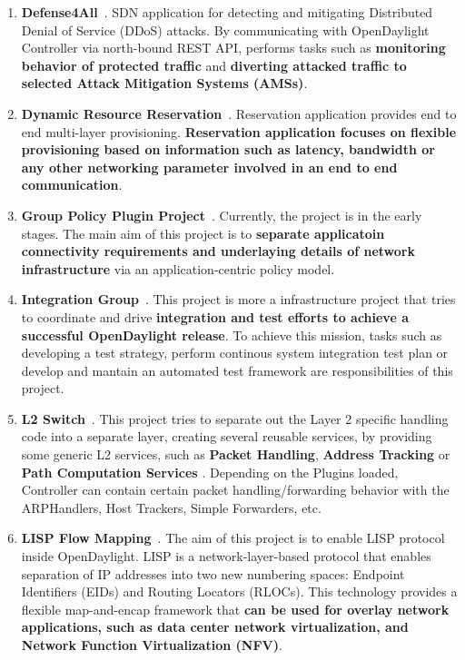 \documentclass[a4paper, 12pt]{book}
\begin{document}
\begin{enumerate}
\item{\textbf{Defense4All}}~\cite{OpenDaylightWikiDefense4All}. SDN application for detecting and mitigating Distributed Denial of Service (DDoS) attacks. By communicating with OpenDaylight Controller via north-bound REST API, performs tasks such as \textbf{monitoring behavior of protected traffic} and \textbf{diverting attacked traffic to selected Attack Mitigation Systems (AMSs)}.
\item{\textbf{Dynamic Resource Reservation}}~\cite{OpenDaylightWikiReservation}. Reservation application provides end to end multi-layer provisioning. \textbf{Reservation application focuses on flexible provisioning based on information such as latency, bandwidth or any other networking parameter involved in an end to end communication}.
\item{\textbf{Group Policy Plugin Project}}~\cite{OpenDaylightWikiGroupPolicy}. Currently, the project is in the early stages. The main aim of this project is to \textbf{separate applicatoin connectivity requirements and underlaying details of network infrastructure} via an application-centric policy model.
\item{\textbf{Integration Group}}~\cite{OpenDaylightWikiIntegration}. This project is more a infrastructure project that tries to coordinate and drive \textbf{integration and test efforts to achieve a successful OpenDaylight release}. To achieve this mission, tasks such as developing a test strategy, perform continous system integration test plan or develop and mantain an automated test framework are responsibilities of this project.
\item{\textbf{L2 Switch}}~\cite{OpenDaylightWikiL2Switch}. This project tries to separate out the Layer 2 specific handling code into a separate layer, creating several reusable services, by providing some generic L2 services, such as \textbf{Packet Handling}, \textbf{Address Tracking} or \textbf{Path Computation Services} . Depending on the Plugins loaded, Controller can contain certain packet handling/forwarding behavior with the ARPHandlers, Host Trackers, Simple Forwarders, etc.
\item{\textbf{LISP Flow Mapping}}~\cite{OpenDaylightWikiLISP}. The aim of this project is to enable LISP protocol~\cite{LISP} inside OpenDaylight. LISP is a network-layer-based protocol that enables separation of IP addresses into two new numbering spaces: Endpoint Identifiers (EIDs) and Routing Locators (RLOCs). This technology provides a flexible map-and-encap framework that \textbf{can be used for overlay network applications, such as data center network virtualization, and Network Function Virtualization (NFV)}.

\end{enumerate}
\end{document}
